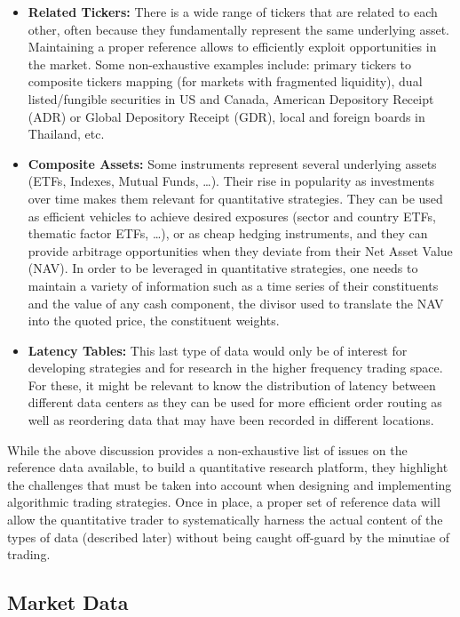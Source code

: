 \begin{itemize}
\item \textbf{Related Tickers:} There is a wide range of tickers that are related to each other, often because they fundamentally represent the same underlying asset. Maintaining a proper reference allows to efficiently exploit opportunities in the market. Some non-exhaustive examples include: primary tickers to composite tickers mapping (for markets with fragmented liquidity), dual listed/fungible securities in US and Canada, American Depository Receipt (ADR) or Global Depository Receipt (GDR), local and foreign boards in Thailand, etc.


\item \textbf{Composite Assets:} Some instruments represent several underlying assets (ETFs, Indexes, Mutual Funds, \dots). Their rise in popularity as investments over time makes them relevant for quantitative strategies. They can be used as efficient vehicles to achieve desired exposures (sector and country ETFs, thematic factor ETFs, \dots), or as cheap hedging instruments, and they can provide arbitrage opportunities when they deviate from their Net Asset Value (NAV). 
In order to be leveraged in quantitative strategies, one needs to maintain a variety of information such as a time series of their constituents and the value of any cash component, the divisor used to translate the NAV into the quoted price, the constituent weights. 


\item \textbf{Latency Tables:} This last type of data would only be of interest for developing strategies and for research in the higher frequency trading space. For these, it might be relevant to know the distribution of latency between different data centers as they can be used for more efficient order routing as well as reordering data that may have been recorded in different locations.
\end{itemize}


While the above discussion provides a non-exhaustive list of issues on the reference data available, to build a quantitative research platform, they highlight the challenges that must be taken into account when designing and implementing algorithmic trading strategies. Once in place, a proper set of reference data will allow the quantitative trader to systematically harness the actual content of the types of data (described later) without being caught off-guard by the minutiae of trading.



\subsection{Market Data\label{subsec:marketdata}}

